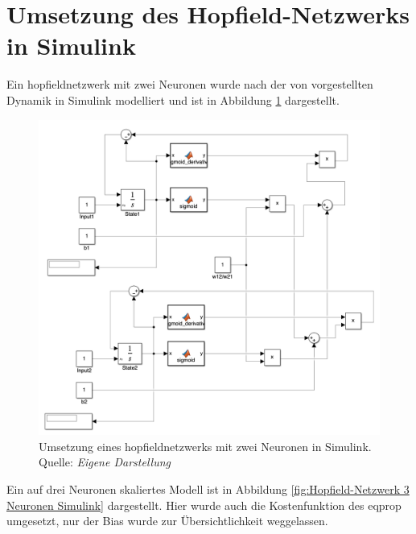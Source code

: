 \section{Umsetzung des Hopfield-Netzwerks in Simulink}
\label{app:Umsetzung des Hopfield-Netzwerks in Simulink}

Ein \gls{hopfieldnetzwerk} mit zwei Neuronen wurde nach der von \cite{Scellier2017} vorgestellten Dynamik in Simulink modelliert und ist in Abbildung \ref{fig:Hopfield-Netzwerk 2 Neuronen Simulink} dargestellt.

\begin{figure}[h]
  \includegraphics[width=\textwidth]{abbildungen/hnn_2_neurons_simulink.png}
  \caption{Umsetzung eines \gls{hopfieldnetzwerk}s mit zwei Neuronen in Simulink. Quelle: \textit{Eigene Darstellung}}
  \label{fig:Hopfield-Netzwerk 2 Neuronen Simulink}
\end{figure}

Ein auf drei Neuronen skaliertes Modell ist in Abbildung \ref{fig:Hopfield-Netzwerk 3 Neuronen Simulink} dargestellt. Hier wurde auch die Kostenfunktion des \gls{eqprop} umgesetzt, nur der Bias wurde zur Übersichtlichkeit weggelassen.

